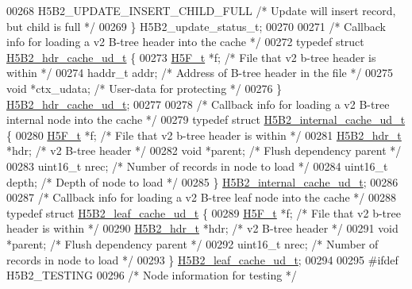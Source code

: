 \begin{DoxyCode}
{{00268     H5B2\_UPDATE\_INSERT\_CHILD\_FULL   \textcolor{comment}{/* Update will insert record, but child is full */}
00269 \} H5B2\_update\_status\_t;
00270 
00271 \textcolor{comment}{/* Callback info for loading a v2 B-tree header into the cache */}
00272 \textcolor{keyword}{typedef} \textcolor{keyword}{struct }\hyperlink{struct_h5_b2__hdr__cache__ud__t}{H5B2\_hdr\_cache\_ud\_t} \{
00273     \hyperlink{struct_h5_f__t}{H5F\_t} *f;                   \textcolor{comment}{/* File that v2 b-tree header is within */}
00274     haddr\_t addr;               \textcolor{comment}{/* Address of B-tree header in the file */}
00275     \textcolor{keywordtype}{void} *ctx\_udata;            \textcolor{comment}{/* User-data for protecting */}
00276 \} \hyperlink{struct_h5_b2__hdr__cache__ud__t}{H5B2\_hdr\_cache\_ud\_t};
00277 
00278 \textcolor{comment}{/* Callback info for loading a v2 B-tree internal node into the cache */}
00279 \textcolor{keyword}{typedef} \textcolor{keyword}{struct }\hyperlink{struct_h5_b2__internal__cache__ud__t}{H5B2\_internal\_cache\_ud\_t} \{
00280     \hyperlink{struct_h5_f__t}{H5F\_t} *f;                   \textcolor{comment}{/* File that v2 b-tree header is within */}
00281     \hyperlink{struct_h5_b2__hdr__t}{H5B2\_hdr\_t} *hdr;            \textcolor{comment}{/* v2 B-tree header */}
00282     \textcolor{keywordtype}{void} *parent;               \textcolor{comment}{/* Flush dependency parent */}
00283     uint16\_t nrec;              \textcolor{comment}{/* Number of records in node to load */}
00284     uint16\_t depth;             \textcolor{comment}{/* Depth of node to load */}
00285 \} \hyperlink{struct_h5_b2__internal__cache__ud__t}{H5B2\_internal\_cache\_ud\_t};
00286 
00287 \textcolor{comment}{/* Callback info for loading a v2 B-tree leaf node into the cache */}
00288 \textcolor{keyword}{typedef} \textcolor{keyword}{struct }\hyperlink{struct_h5_b2__leaf__cache__ud__t}{H5B2\_leaf\_cache\_ud\_t} \{
00289     \hyperlink{struct_h5_f__t}{H5F\_t} *f;                   \textcolor{comment}{/* File that v2 b-tree header is within */}
00290     \hyperlink{struct_h5_b2__hdr__t}{H5B2\_hdr\_t} *hdr;            \textcolor{comment}{/* v2 B-tree header */}
00291     \textcolor{keywordtype}{void} *parent;               \textcolor{comment}{/* Flush dependency parent */}
00292     uint16\_t nrec;              \textcolor{comment}{/* Number of records in node to load */}
00293 \} \hyperlink{struct_h5_b2__leaf__cache__ud__t}{H5B2\_leaf\_cache\_ud\_t};
00294 
00295 \textcolor{preprocessor}{#ifdef H5B2\_TESTING}
00296 \textcolor{comment}{/* Node information for testing */}
}}
\end{DoxyCode}
